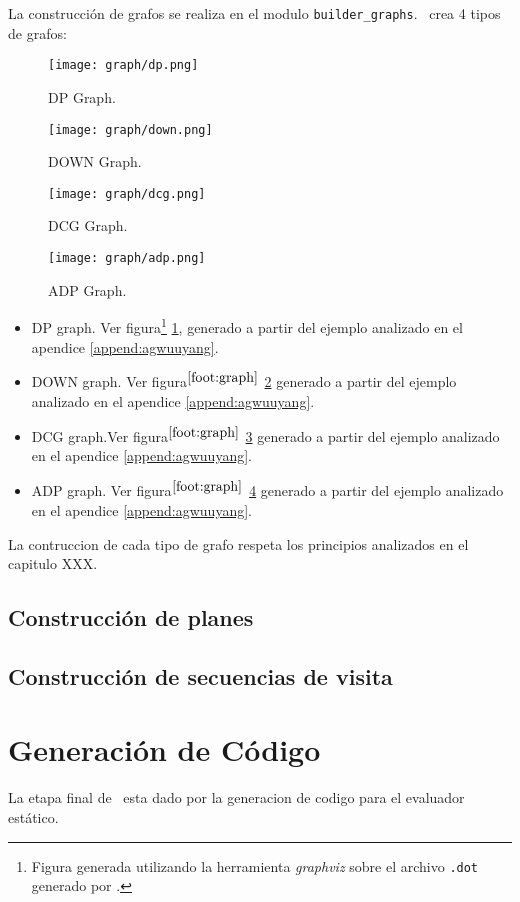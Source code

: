 La construcción de grafos se realiza en el modulo \texttt{builder\_graphs}. \maggen\ crea 4 tipos de grafos:
\begin{figure}\centering
 \texttt{[image: graph/dp.png]}
\caption{\label{dpgraph} DP Graph.}
\end{figure}

\begin{figure}\centering
 \texttt{[image: graph/down.png]}
\caption{\label{downgraph} DOWN Graph.}
\end{figure}

\begin{figure}\centering
 \texttt{[image: graph/dcg.png]}
\caption{\label{dcggraph} DCG Graph.}
\end{figure}

\begin{figure}\centering
 \texttt{[image: graph/adp.png]}
\caption{\label{adpgraph} ADP Graph.}
\end{figure}


\begin{itemize}
\item DP graph. Ver figura\footnote {\label{foot:graph} Figura generada utilizando la herramienta \textit{graphviz} sobre el archivo \texttt{.dot} generado por \maggen.} \ref{dpgraph}, generado a partir del ejemplo analizado en el apendice \ref{append:agwuuyang}.
\item DOWN graph. Ver figura$^{\ref{foot:graph}}$ \ref{downgraph} generado a partir del ejemplo analizado en el apendice \ref{append:agwuuyang}.
\item DCG graph.Ver figura$^{\ref{foot:graph}}$ \ref{dcggraph} generado a partir del ejemplo analizado en el apendice \ref{append:agwuuyang}.
\item ADP graph. Ver figura$^{\ref{foot:graph}}$  \ref{adpgraph} generado a partir del ejemplo analizado en el apendice \ref{append:agwuuyang}.
\end{itemize}

La contruccion de cada tipo de grafo respeta los principios analizados en el capitulo XXX.


\subsection*{Construcción de planes}
\subsection*{Construcción de secuencias de visita}


\section{Generación de Código}
La etapa final de \maggen\ esta dado por la generacion de codigo para el evaluador estático. 